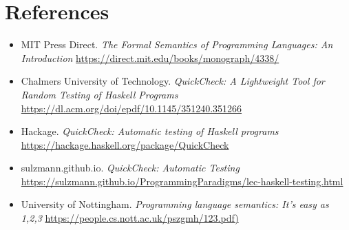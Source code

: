 \documentclass{article}
\begin{document}
	\section{References}
	\begin{itemize}
		\item MIT Press Direct. \textit{The Formal Semantics of Programming Languages: An Introduction} \url{https://direct.mit.edu/books/monograph/4338/}
		\item Chalmers University of Technology. \textit{QuickCheck: A Lightweight Tool for Random Testing of Haskell Programs} \url{https://dl.acm.org/doi/epdf/10.1145/351240.351266}
		\item Hackage. \textit{QuickCheck: Automatic testing of Haskell programs} \url{https://hackage.haskell.org/package/QuickCheck}
		\item sulzmann.github.io. \textit{QuickCheck: Automatic Testing} \url{https://sulzmann.github.io/ProgrammingParadigms/lec-haskell-testing.html}
		\item University of Nottingham. \textit{Programming language semantics: It’s easy as 1,2,3} \url{https://people.cs.nott.ac.uk/pszgmh/123.pdf)}
	\end{itemize}
	
\end{document}
